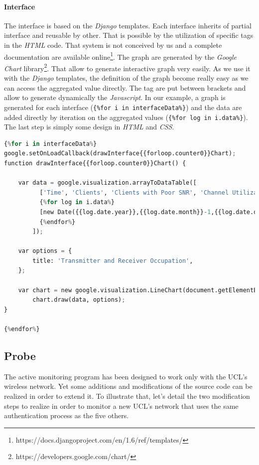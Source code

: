 \paragraph*{Interface} The interface is based on the \emph{Django} templates. Each interface inherits of partial interface and reusable by other. That is possible by the utilization of specific tags in the \emph{HTML} code. That system is not conceived by us and a complete documentation are available online\footnote{https://docs.djangoproject.com/en/1.6/ref/templates/}. The graph are generated by the \emph{Google Chart} library\footnote{https://developers.google.com/chart/}. That allow to generate interactive graph very easily. As we use it with the \emph{Django} templates, the definition of the graph become really easy as we can access the aggregated value directly. The tag are put between brackets and allow to generate dynamically the \emph{Javascript}. In our example, a graph is generated for each interface (\texttt{\{\%for i in interfaceData\%\}}) and the data are added directly by iteration on the aggregated values (\texttt{\{\%for log in i.data\%\}}). The last step is simply some design in \emph{HTML} and \emph{CSS}.

\begin{lstlisting}[language=Python, frame=single,breaklines=true,caption={Example of Graph definition}]
{%for i in interfaceData%}
google.setOnLoadCallback(drawInterface{{forloop.counter0}}Chart);
function drawInterface{{forloop.counter0}}Chart() {
		
	var data = google.visualization.arrayToDataTable([
		  ['Time', 'Clients', 'Clients with Poor SNR', 'Channel Utilization'],
		  {%for log in i.data%}
		  [new Date({{log.date.year}},{{log.date.month}}-1,{{log.date.day}},{{log.date.hour}},{{log.date.minute}},{{log.date.second}}), {{log.data.rxUtilization}} , {{log.data.txUtilization}}],
		  {%endfor%}
		]);

	var options = {
		title: 'Transmitter and Receiver Occupation',
	};

	var chart = new google.visualization.LineChart(document.getElementById('interface{{forloop.counter0}}chart_div'));
		chart.draw(data, options);
}

{%endfor%}
\end{lstlisting}

\subsection{Probe}
The active monitoring program has been designed to work only with the UCL's wireless network. Yet some additions and modifications of the source code can be realized in order to extend it. To illustrate that, let's detail the two modification steps to realize in order to monitor a new UCL's network that uses the same authentication process as the five others.

